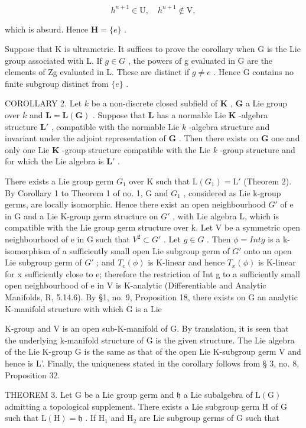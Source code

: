 \[
h ^ {n + 1} \in \mathrm{U}, \quad h ^ {n + 1} \notin \mathrm{V},
\]

which is absurd. Hence \(\mathbf{H} = \{e\}\) .

Suppose that K is ultrametric. It suffices to prove the corollary when G is the Lie group associated with L. If \(g \in G\) , the powers of g evaluated in G are the elements of Zg evaluated in L. These are distinct if \(g \neq e\) . Hence G contains no finite subgroup distinct from \(\{e\}\) .

COROLLARY 2. Let \(k\) be a non-discrete closed subfield of \(\mathbf{K}\) , \(\mathbf{G}\) a Lie group over \(k\) and \(\mathbf{L} = \mathbf{L}(\mathbf{G})\) . Suppose that \(\mathbf{L}\) has a normable Lie \(\mathbf{K}\) -algebra structure \(\mathbf{L}'\) , compatible with the normable Lie \(k\) -algebra structure and invariant under the adjoint representation of \(\mathbf{G}\) . Then there exists on \(\mathbf{G}\) one and only one Lie \(\mathbf{K}\) -group structure compatible with the Lie \(k\) -group structure and for which the Lie algebra is \(\mathbf{L}'\) .

There exists a Lie group germ \(G_{1}\) over K such that \(\mathrm{L}(G_{1}) = \mathrm{L}'\) (Theorem 2). By Corollary 1 to Theorem 1 of no. 1, G and \(G_{1}\) , considered as Lie k-group germs, are locally isomorphic. Hence there exist an open neighbourhood \(G'\) of e in G and a Lie K-group germ structure on \(G'\) , with Lie algebra L, which is compatible with the Lie group germ structure over k. Let V be a symmetric open neighbourhood of e in G such that \(V^{2} \subset G'\) . Let \(g \in G\) . Then \(\phi = Int g\) is a k-isomorphism of a sufficiently small open Lie subgroup germ of \(G'\) onto an open Lie subgroup germ of \(G'\) ; and \(T_{e}(\phi)\) is K-linear and hence \(T_{x}(\phi)\) is K-linear for x sufficiently close to e; therefore the restriction of Int g to a sufficiently small open neighbourhood of e in V is K-analytic (Differentiable and Analytic Manifolds, R, 5.14.6). By §1, no. 9, Proposition 18, there exists on G an analytic K-manifold structure with which G is a Lie

K-group and V is an open sub-K-manifold of G. By translation, it is seen that the underlying k-manifold structure of G is the given structure. The Lie algebra of the Lie K-group G is the same as that of the open Lie K-subgroup germ V and hence is L'. Finally, the uniqueness stated in the corollary follows from § 3, no. 8, Proposition 32.

THEOREM 3. Let G be a Lie group germ and \(\mathfrak{h}\) a Lie subalgebra of \(\mathrm{L}(\mathrm{G})\) admitting a topological supplement. There exists a Lie subgroup germ H of G such that \(\mathrm{L}(\mathrm{H}) = \mathfrak{h}\) . If \(\mathrm{H}_1\) and \(\mathrm{H}_2\) are Lie subgroup germs of G such that

